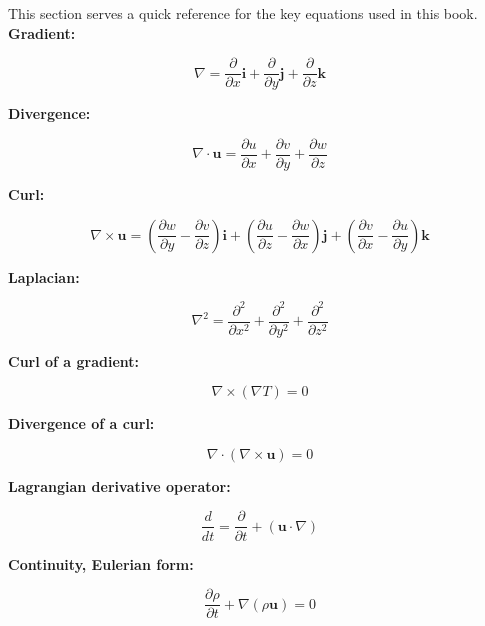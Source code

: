 \documentclass[12pt]{article}
\numberwithin{equation}{section}
\numberwithin{figure}{section}
\numberwithin{table}{section}
\begin{document}
This section serves a quick reference for the key equations used in this book.\\

\textbf{Gradient:}

\begin{equation}
  \nabla = \frac{\partial}{\partial x} \mathbf{i} + \frac{\partial}{\partial y} \mathbf{j} + \frac{\partial}{\partial z} \mathbf{k}
\end{equation}

\textbf{Divergence:}

\begin{equation}
  \nabla \cdot \mathbf{u} = \frac{\partial u}{\partial x} + \frac{\partial v}{\partial y} + \frac{\partial w}{\partial z}
\end{equation}

\textbf{Curl:}

\begin{equation}
  \nabla \times \mathbf{u} = \left( \frac{\partial w}{\partial y} - \frac{\partial v}{\partial z} \right) \mathbf{i} + \left( \frac{\partial u}{\partial z} - \frac{\partial w}{\partial x} \right) \mathbf{j} + \left( \frac{\partial v}{\partial x} - \frac{\partial u}{\partial y} \right) \mathbf{k}
\end{equation}

\textbf{Laplacian:}

\begin{equation}
  \nabla^2 = \frac{\partial^2}{\partial x^2} + \frac{\partial^2}{\partial y^2} + \frac{\partial^2}{\partial z^2}
\end{equation}

\textbf{Curl of a gradient:}

\begin{equation}
  \nabla \times (\nabla T) = 0
\end{equation}

\textbf{Divergence of a curl:}

\begin{equation}
  \nabla \cdot (\nabla \times \mathbf{u}) = 0
\end{equation}

\textbf{Lagrangian derivative operator:}
 
\begin{equation}
  \frac{d}{dt} = \frac{\partial}{\partial t} + (\mathbf{u} \cdot \nabla)
\end{equation}

\textbf{Continuity, Eulerian form:}

\begin{equation}
  \frac{\partial \rho}{\partial t} + \nabla (\rho \mathbf{u}) = 0
\end{equation}
\end{document}
